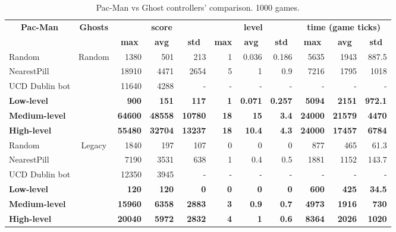 \begin{sidewaystable}[]
\centering
\begin{tabular}{|l|c|r|r|r|r|r|r|r|r|r|}
\hline
\multicolumn{1}{|c|}{\multirow{2}{*}{\textbf{Pac-Man}}} & \multirow{2}{*}{\textbf{Ghosts}} & \multicolumn{3}{c|}{\textbf{score}} & \multicolumn{3}{c|}{\textbf{level}} & \multicolumn{3}{c|}{\textbf{time (game ticks)}} \\ \cline{3-11} 
\multicolumn{1}{|c|}{} &  & \multicolumn{1}{c|}{\textbf{max}} & \multicolumn{1}{c|}{\textbf{avg}} & \multicolumn{1}{c|}{\textbf{std}} & \multicolumn{1}{c|}{\textbf{max}} & \multicolumn{1}{c|}{\textbf{avg}} & \multicolumn{1}{c|}{\textbf{std}} & \multicolumn{1}{c|}{\textbf{max}} & \multicolumn{1}{c|}{\textbf{avg}} & \multicolumn{1}{c|}{\textbf{std}} \\ \hline
Random &  \multirow{5}{*}{Random} & 1380 & 501 & 213 & 1 & 0.036 & 0.186 & 5635 & 1943 & 887.5 \\ \cline{1-1} \cline{3-11} 
NearestPill &  & 18910 & 4471 & 2654 & 5 & 1 & 0.9 & 7216 & 1795 & 1018 \\ \cline{1-1} \cline{3-11} 
UCD Dublin bot \cite{galvan2010evolving} &  & 11640 & 4288 & - & - & - & - & - & - & - \\ \cline{1-1} \cline{3-11} 
\textbf{Low-level} &  & \textbf{900} & \textbf{151} & \textbf{117} & \textbf{1} & \textbf{0.071} & \textbf{0.257} & \textbf{5094} & \textbf{2151} & \textbf{972.1} \\ \cline{1-1} \cline{3-11} 
\textbf{Medium-level} &  & \textbf{64600} & \textbf{48558} & \textbf{10780} & \textbf{18} & \textbf{15} & \textbf{3.4} & \textbf{24000} & \textbf{21579} & \textbf{4470} \\ \cline{1-1} \cline{3-11} 
\textbf{High-level} &  & \textbf{55480} & \textbf{32704} & \textbf{13237} & \textbf{18} & \textbf{10.4} & \textbf{4.3} & \textbf{24000} & \textbf{17457} & \textbf{6784} \\ \hline
Random & \multirow{5}{*}{Legacy} & 1840 & 197 & 107 & 0 & 0 & 0 & 877 & 465 & 61.3 \\ \cline{1-1} \cline{3-11} 
NearestPill &  & 7190 & 3531 & 638 & 1 & 0.4 & 0.5 & 1881 & 1152 & 143.7 \\ \cline{1-1} \cline{3-11} 
UCD Dublin bot \cite{galvan2010evolving} &  & 12350 & 3945 & - & - & - & - & - & - & - \\ \cline{1-1} \cline{3-11} 
\textbf{Low-level} &  & \textbf{120} & \textbf{120} & \textbf{0} & \textbf{0} & \textbf{0} & \textbf{0} & \textbf{600} & \textbf{425} & \textbf{34.5} \\ \cline{1-1} \cline{3-11} 
\textbf{Medium-level} &  & \textbf{15960} & \textbf{6358} & \textbf{2883} & \textbf{3} & \textbf{0.9} & \textbf{0.7} & \textbf{4973} & \textbf{1916} & \textbf{730} \\ \cline{1-1} \cline{3-11} 
\textbf{High-level} &  & \textbf{20040} & \textbf{5972} & \textbf{2832} & \textbf{4} & \textbf{1} & \textbf{0.6} & \textbf{8364} & \textbf{2026} & \textbf{1020} \\ \hline
\end{tabular}
\caption{Pac-Man vs Ghost controllers' comparison. 1000 games.}
\label{table:single_obj}
\end{sidewaystable}

